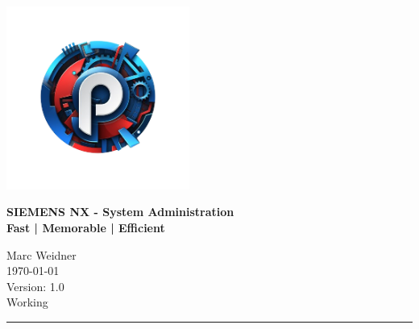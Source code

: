 \documentclass[a4paper, 10pt]{scrartcl} %
\begin{document}
	
	\begin{titlepage}
		\begingroup
		\raggedleft
		\includegraphics[width=6cm]{pics/logo}
		
		\vspace{3cm}
		\textbf{{SIEMENS NX - System Administration}}\\
		\textbf{{\small Fast | Memorable | Efficient}}
		
		
		\vspace{10cm}
		Marc Weidner\\
		{\today}\\	
		Version: 1.0\\
		Working\\
		\rule{0.2\linewidth}{1pt}%
		\par
		\endgroup
	\end{titlepage}
	
	
	\tableofcontents
	\pagebreak
	
	
	\listoffigures
	
	
	
	
\end{document}
